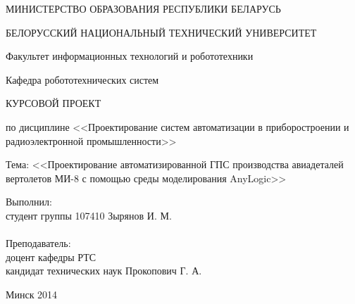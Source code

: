 \begin{titlepage} %

\thispagestyle{empty} %

\begin{center}
МИНИСТЕРСТВО ОБРАЗОВАНИЯ РЕСПУБЛИКИ БЕЛАРУСЬ

БЕЛОРУССКИЙ НАЦИОНАЛЬНЫЙ ТЕХНИЧЕСКИЙ УНИВЕРСИТЕТ

Факультет информационных технологий и робототехники

Кафедра робототехнических систем
\end{center}

\vfill

\begin{center}
    \large{КУРСОВОЙ ПРОЕКТ}

    \normalsize{по дисциплине <<Проектирование систем автоматизации в приборостроении и радиоэлектронной промышленности>>}

    \normalsize{Тема: <<Проектирование автоматизированной ГПС производства авиадеталей вертолетов МИ-8 с помощью среды моделирования AnyLogic>>}
\end{center}

\vfill

\noindent
Выполнил:\\
студент группы 107410 \hfill Зырянов И. М.
\\
\\
\noindent
Преподаватель:\\
доцент кафедры РТС\\
кандидат технических наук \hfill Прокопович Г. А.

\vfill

\centerline{Минск 2014}

\clearpage %

\end{titlepage}





